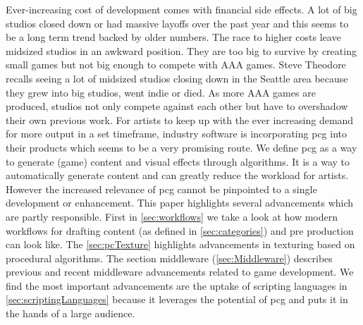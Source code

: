 \documentclass[10pt,a4paper]{article}
\begin{document}
\begin{multicols}{2}
Ever-increasing cost of development comes with financial side effects. A lot of big studios closed down or had massive layoffs over the past year \cite{Lahti2018, Schreier2019, Walker2019, Schreier2019a} and this seems to be a long term trend backed by older numbers\cite{Plunkett2012}. The race to higher costs leave midsized studios in an awkward position. They are too big to survive by creating small games but not big enough to compete with AAA games. Steve Theodore recalls seeing a lot of midsized studios closing down in the Seattle area because they grew into big studios, went indie or died\cite{Prinke2017}. As more AAA games are produced, studios not only compete against each other but have to overshadow their own previous work. For artists to keep up with the ever increasing demand for more output in a set timeframe, industry software is incorporating \gls{pcg} into their products which seems to be a very promising route. We define \gls{pcg} as a way to generate (game) content and visual effects through algorithms. It is a way to automatically generate content and can greatly reduce the workload for artists. However the increased relevance of \gls{pcg} cannot be pinpointed to a single development or enhancement. This paper highlights several advancements which are partly responsible. First in \autoref{sec:workflows} we take a look at how modern workflows for drafting content (as defined in \autoref{sec:categories}) and pre production can look like. The \autoref{sec:pcTexture} highlights advancements in texturing based on procedural algorithms. The section middleware (\autoref{sec:Middleware}) describes previous and recent middleware advancements related to game development. We find the most important advancements are the uptake of scripting languages in \autoref{sec:scriptingLanguages} because it leverages the potential of \gls{pcg} and puts it in the hands of a large audience.
\end{multicols}
\end{document}
